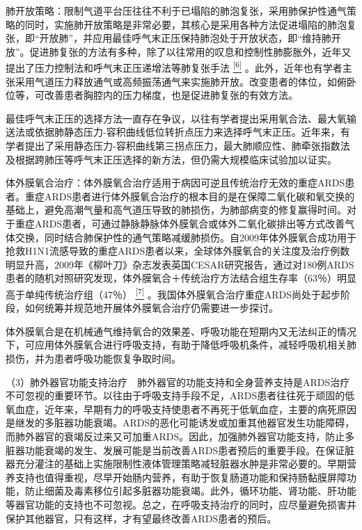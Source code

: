 肺开放策略：限制气道平台压往往不利于已塌陷的肺泡复张，采用肺保护性通气策略的同时，实施肺开放策略是非常必要，其核心是采用各种方法促进塌陷的肺泡复张，即“开放肺”，并应用最佳呼气末正压保持肺泡处于开放状态，即“维持肺开放”。促进肺复张的方法有多种，除了以往常用的叹息和控制性肺膨胀外，近年又提出了压力控制法和呼气末正压递增法等肺复张手法
\protect\hyperlink{text00011.htmlux5cux23ch6-10}{\textsuperscript{{[}6{]}}}
。此外，近年也有学者主张采用气道压力释放通气或高频振荡通气来实施肺开放。改变患者的体位，如俯卧位等，可改善患者胸腔内的压力梯度，也是促进肺复张的有效方法。

最佳呼气末正压的选择方法一直存在争议，以往有学者提出采用氧合法、最大氧输送法或依据肺静态压力-容积曲线低位转折点压力来选择呼气末正压。近年来，有学者提出了采用静态压力-容积曲线第三拐点压力，最大肺顺应性、肺牵张指数法及根据跨肺压等呼气末正压选择的新方法，但仍需大规模临床试验加以证实。

体外膜氧合治疗：体外膜氧合治疗适用于病因可逆且传统治疗无效的重症ARDS患者。重症ARDS患者进行体外膜氧合治疗的根本目的是在保障二氧化碳和氧交换的基础上，避免高潮气量和高气道压导致的肺损伤，为肺部病变的修复赢得时间。对于重症ARDS患者，可通过静脉静脉体外膜氧合或体外二氧化碳排出等方式改善气体交换，同时结合肺保护性的通气策略减缓肺损伤。自2009年体外膜氧合成功用于抢救H1N1流感导致的重症ARDS患者以来，全球体外膜氧合的关注度及治疗例数明显升高，2009年《柳叶刀》杂志发表英国CESAR研究报告，通过对180例ARDS患者的随机对照研究发现，体外膜氧合＋传统治疗方法结合组生存率（63％）明显高于单纯传统治疗组（47％）
\protect\hyperlink{text00011.htmlux5cux23ch7-10}{\textsuperscript{{[}7{]}}}
。我国体外膜氧合治疗重症ARDS尚处于起步阶段，如何统筹并规范地开展体外膜氧合治疗仍需要进一步探讨。

体外膜氧合是在机械通气维持氧合的效果差、呼吸功能在短期内又无法纠正的情况下，可应用体外膜氧合进行呼吸支持，有助于降低呼吸机条件，减轻呼吸机相关肺损伤，并为患者呼吸功能恢复争取时间。

（3）肺外器官功能支持治疗　肺外器官的功能支持和全身营养支持是ARDS治疗不可忽视的重要环节。以往由于呼吸支持手段不足，ARDS患者往往死于顽固的低氧血症，近年来，早期有力的呼吸支持使患者不再死于低氧血症，主要的病死原因是继发的多脏器功能衰竭。ARDS的恶化可能诱发或加重其他器官发生功能障碍，而肺外器官的衰竭反过来又可加重ARDS。因此，加强肺外器官功能支持，防止多脏器功能衰竭的发生、发展可能是当前改善ARDS患者预后的重要手段。在保证脏器充分灌注的基础上实施限制性液体管理策略减轻脏器水肿是非常必要的。早期营养支持也值得重视，尽早开始肠内营养，有助于恢复肠道功能和保持肠黏膜屏障功能，防止细菌及毒素移位引起多脏器功能衰竭。此外，循环功能、肾功能、肝功能等器官功能的支持也不可忽视。总之，在呼吸支持治疗的同时，应尽量避免损害并保护其他器官，只有这样，才有望最终改善ARDS患者的预后。

